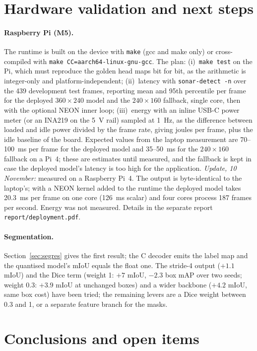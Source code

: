 \documentclass[11pt,a4paper]{article}
\begin{document}
\section{Hardware validation and next steps}
\label{sec:next}

\paragraph{Raspberry Pi (M5).} The runtime is built on the device with
\texttt{make} (gcc and make only) or cross-compiled with \texttt{make
CC=aarch64-linux-gnu-gcc}. The plan: (i)~\texttt{make test} on the Pi, which
must reproduce the golden head maps bit for bit, as the arithmetic is
integer-only and platform-independent; (ii)~latency with \texttt{sonar-detect
-n} over the 439 development test frames, reporting mean and 95th percentile
per frame for the deployed $360 \times 240$ model and the $240 \times 160$
fallback, single core, then with the optional NEON inner loop;
(iii)~energy with an inline USB-C power meter (or an INA219 on the 5~V rail)
sampled at 1~Hz, as the difference between loaded and idle power divided by
the frame rate, giving joules per frame, plus the idle baseline of the board.
Expected values from the laptop measurement are 70--100~ms per frame for the
deployed model and 35--50~ms for the $240 \times 160$ fallback on a Pi~4;
these are estimates until measured, and the fallback is kept in case the
deployed model's latency is too high for the application. \emph{Update,
10 November:} measured on a Raspberry Pi~4. The output is byte-identical to the
laptop's; with a NEON kernel added to the runtime the deployed model takes
20.3~ms per frame on one core (126~ms scalar) and four cores process 187
frames per second. Energy was not measured. Details in the separate report
\texttt{report/deployment.pdf}.

\paragraph{Segmentation.} Section~\ref{sec:segres} gives the first
result; the C decoder emits the label map and the quantised model's mIoU
equals the float one. The stride-4 output ($+1.1$ mIoU) and the Dice term (weight 1: $+7$ mIoU,
$-2.3$ box mAP over two seeds; weight 0.3: $+3.9$ mIoU at unchanged boxes)
and a wider backbone ($+4.2$ mIoU, same box cost) have been tried; the
remaining levers are a Dice weight between 0.3 and 1, or a separate
feature branch for the masks.

\section{Conclusions and open items}
\end{document}
